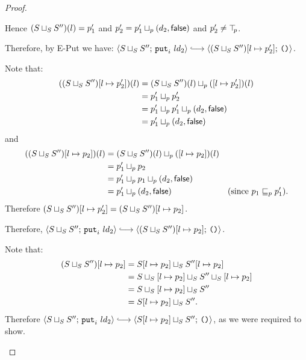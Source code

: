 \begin{proof}
\begin{itemize}
\begin{itemize}
          Hence $(S \sqcup_{S} S'')(l) = p'_1$ and $p'_2 =
          p'_1 \sqcup_p (d_2, \textsf{false})$ and $p'_2 \neq
          \top\hspace{-0.85mm}_{p}$.

          Therefore, by {\sc E-Put} we have:
          $\config{\lubstore{S}{S''}}{\putiexp{l}{d_2}} \parstepsto
          \config{\extSRaw{(\lubstore{S}{S''})}{l}{p'_2}}{\unit}$.


          Note that:
          \begin{align*}
            ((S \sqcup_{S} S'')[l \mapsto p'_2])(l) &= (S \sqcup_{S} S'')(l) \sqcup_p (\left[ l \mapsto p'_2 \right])(l) \\
            &= p'_1 \sqcup_p p'_2 \\
            &= p'_1 \sqcup_p p'_1 \sqcup_p (d_2, \textsf{false}) \\
            &= p'_1 \sqcup_p (d_2, \textsf{false})
          \end{align*}
          and
          \begin{align*}
            ((S \sqcup_{S} S'')[l \mapsto p_2])(l) &= (S \sqcup_{S} S'')(l) \sqcup_p (\left[ l \mapsto p_2 \right])(l) \\
            &= p'_1 \sqcup_p p_2 \\
            &= p'_1 \sqcup_p p_1 \sqcup_p (d_2, \textsf{false}) \\
            &= p'_1 \sqcup_p (d_2, \textsf{false}) & \textrm{(since $p_1 \sqsubseteq_p p'_1$).}
          \end{align*}
          Therefore $(S \sqcup_{S} S'')[l \mapsto p'_2] =
          (S \sqcup_{S} S'')[l \mapsto p_2]$.

          Therefore, $\config{\lubstore{S}{S''}}{\putiexp{l}{d_2}}
          \parstepsto
          \config{\extSRaw{(\lubstore{S}{S''})}{l}{p_2}}{\unit}$.
      \end{itemize}

      Note that:
      \begin{align*}
        (S \sqcup_{S} S'')[l \mapsto p_2] &= S[l \mapsto p_2] \sqcup_{S} S''[l \mapsto p_2] \\
        &= S \sqcup_{S} \left[ l \mapsto p_2 \right] \sqcup_{S} S'' \sqcup_{S} \left[ l \mapsto p_2 \right] \\
        &= S \sqcup_{S} \left[ l \mapsto p_2 \right] \sqcup_{S} S'' \\
        &= S[l \mapsto p_2] \sqcup_{S} S''.
      \end{align*}
      Therefore $\config{\lubstore{S}{S''}}{\putiexp{l}{d_2}}
      \parstepsto \config{\lubstore{\extSRaw{S}{l}{p_2}}{S''}}{\unit}$,
      as we were required to show.


\end{itemize}
\end{proof}
